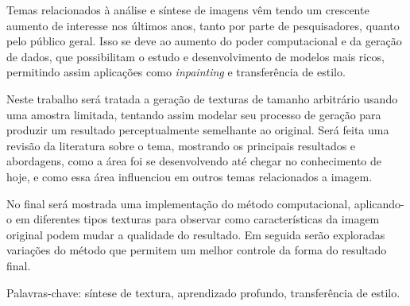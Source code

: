\setlength{\absparsep}{18pt} 
\begin{resumo}[Resumo]
 
Temas relacionados à análise e síntese de imagens vêm
tendo um crescente aumento de interesse nos últimos anos,
tanto por parte de pesquisadores, quanto pelo público geral.
Isso se deve ao aumento do poder computacional e da
geração de dados, que possibilitam o estudo e desenvolvimento
de modelos mais ricos, permitindo assim aplicações como 
\textit{inpainting} e transferência de estilo.

Neste trabalho será tratada a geração de texturas de
tamanho arbitrário usando uma amostra limitada,
tentando assim modelar seu processo de geração para
produzir um resultado perceptualmente semelhante
ao original. Será feita uma revisão da literatura
sobre o tema, mostrando os principais resultados e
abordagens, como a área foi se desenvolvendo até
chegar no conhecimento de hoje, e como essa área
influenciou em outros temas relacionados a imagem.

No final será mostrada uma implementação do método
computacional, aplicando-o
em diferentes tipos texturas para observar como
características da imagem original podem mudar a
qualidade do resultado. Em seguida serão exploradas
variações do método que permitem um melhor controle
da forma do resultado final.


 Palavras-chave: síntese de textura, aprendizado profundo, transferência de estilo.
\end{resumo}

